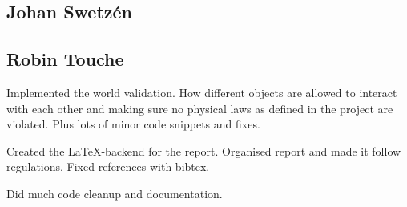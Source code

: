 \subsection*{Johan Swetz\'en}
\subsection*{Robin Touche}
Implemented the world validation.
How different objects are allowed to interact with each other and making sure no physical laws as defined in the project are violated.
Plus lots of minor code snippets and fixes.

Created the \LaTeX-backend for the report.
Organised report and made it follow regulations.
Fixed references with bibtex.

Did much code cleanup and documentation.
